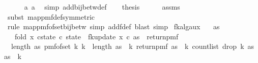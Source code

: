 \begin{isabellebody}
\ \ \ \ \isamarkupfalse%
\ a{}\ a{}\ \isamarkupfalse%
\ {\isacharparenleft}{\kern0pt}simp\ add{\isacharcolon}{\kern0pt}bij{\isacharunderscore}{\kern0pt}betw{\isacharunderscore}{\kern0pt}def{\isacharparenright}{\kern0pt}\isanewline
\ \ \isamarkupfalse%
\ {\isacharquery}{\kern0pt}thesis\isanewline
\ \ \ \ \isamarkupfalse%
\ assms\ \isamarkupfalse%
\ {\isacharparenleft}{\kern0pt}subst\ map{\isacharunderscore}{\kern0pt}pmf{\isacharunderscore}{\kern0pt}def{\isacharbrackleft}{\kern0pt}symmetric{\isacharbrackright}{\kern0pt}{\isacharparenright}{\kern0pt}\isanewline
\ \ \ \ \isamarkupfalse%
\ {\isacharparenleft}{\kern0pt}rule\ map{\isacharunderscore}{\kern0pt}pmf{\isacharunderscore}{\kern0pt}of{\isacharunderscore}{\kern0pt}set{\isacharunderscore}{\kern0pt}bij{\isacharunderscore}{\kern0pt}betw{\isacharcomma}{\kern0pt}\ simp\ add{\isacharcolon}{\kern0pt}f{\isacharunderscore}{\kern0pt}def{\isacharcomma}{\kern0pt}\ blast{\isacharcomma}{\kern0pt}\ simp{\isacharparenright}{\kern0pt}\isanewline
{}\isamarkupfalse%
%
\endisatagproof
{\isafoldproof}%
%
\isadelimproof
\isanewline
%
\endisadelimproof
\isanewline
{}\isamarkupfalse%
\ fk{\isacharunderscore}{\kern0pt}alg{\isacharunderscore}{\kern0pt}aux{\isacharunderscore}{\kern0pt}{}{\isacharcolon}{\kern0pt}\isanewline
\ \ \ {\isachardoublequoteopen}as\ {\isasymnoteq}\ {\isacharbrackleft}{\kern0pt}{\isacharbrackright}{\kern0pt}{\isachardoublequoteclose}\isanewline
\ \ \ {\isachardoublequoteopen}fold\ {\isacharparenleft}{\kern0pt}{\isasymlambda}x\ {\isacharparenleft}{\kern0pt}c{\isacharcomma}{\kern0pt}state{\isacharparenright}{\kern0pt}{\isachardot}{\kern0pt}\ {\isacharparenleft}{\kern0pt}c{\isacharplus}{\kern0pt}{}{\isacharcomma}{\kern0pt}\ state\ {\isasymbind}\ fk{\isacharunderscore}{\kern0pt}update{\isacharprime}{\kern0pt}{\isacharprime}{\kern0pt}\ x\ c{\isacharparenright}{\kern0pt}{\isacharparenright}{\kern0pt}\ as\ {\isacharparenleft}{\kern0pt}{}{\isacharcomma}{\kern0pt}\ return{\isacharunderscore}{\kern0pt}pmf\ {\isacharparenleft}{\kern0pt}{}{\isacharcomma}{\kern0pt}{}{\isacharparenright}{\kern0pt}{\isacharparenright}{\kern0pt}\ {\isacharequal}{\kern0pt}\isanewline
\ \ {\isacharparenleft}{\kern0pt}length\ as{\isacharcomma}{\kern0pt}\ pmf{\isacharunderscore}{\kern0pt}of{\isacharunderscore}{\kern0pt}set\ {\isacharbraceleft}{\kern0pt}k{\isachardot}{\kern0pt}\ k\ {\isacharless}{\kern0pt}\ length\ as{\isacharbraceright}{\kern0pt}\ {\isasymbind}\ {\isacharparenleft}{\kern0pt}{\isasymlambda}k{\isachardot}{\kern0pt}\ return{\isacharunderscore}{\kern0pt}pmf\ {\isacharparenleft}{\kern0pt}as\ {\isacharbang}{\kern0pt}\ k{\isacharcomma}{\kern0pt}\ count{\isacharunderscore}{\kern0pt}list\ {\isacharparenleft}{\kern0pt}drop\ {\isacharparenleft}{\kern0pt}k{\isacharplus}{\kern0pt}{}{\isacharparenright}{\kern0pt}\ as{\isacharparenright}{\kern0pt}\ {\isacharparenleft}{\kern0pt}as\ {\isacharbang}{\kern0pt}\ k{\isacharparenright}{\kern0pt}{\isacharparenright}{\kern0pt}{\isacharparenright}{\kern0pt}{\isacharparenright}{\kern0pt}{\isachardoublequoteclose}\isanewline

\end{isabellebody}
